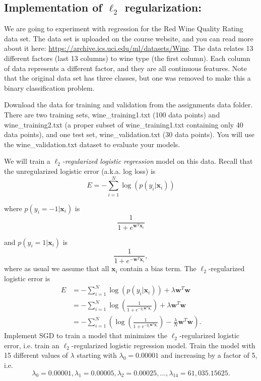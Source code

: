 \documentclass{article}
\begin{document}
\begin{solution}

\end{solution}

\subsection{Implementation of \texorpdfstring{$\ell_2$}{L2} regularization:}

We are going to experiment with regression for the Red Wine Quality Rating data set. The data set is uploaded on the course website, and you can read more about it here: \url{https://archive.ics.uci.edu/ml/datasets/Wine}. The data relates 13 different factors (last 13 columns) to wine type (the first column). Each column of data represents a different factor, and they are all continuous features. Note that the original data set has three classes, but one was removed to make this a binary classification problem.

Download the data for training and validation from the assignments data folder.
There are two training sets, wine\_training1.txt (100 data points) and wine\_training2.txt (a proper subset of wine\_training1.txt containing only 40 data points), and one test set, wine\_validation.txt (30 data points). You will use the wine\_validation.txt dataset to evaluate your models.

We will train a \emph{$\ell_2$-regularized logistic regression} model on this data. Recall that the unregularized logistic error (a.k.a. log loss) is
\[E = -\sum_{i=1}^{N}\log(p(y_i | \mathbf{x}_i))\]

where $p(y_i = -1 | \mathbf{x}_i)$ is
\[\frac{1}{1 + e^{\mathbf{w}^T\mathbf{x}_i}}\]

and $p(y_i = 1 | \mathbf{x}_i)$ is
\[\frac{1}{1 + e^{-\mathbf{w}^T\mathbf{x}_i}},\]
where as usual we assume that all $\mathbf{x}_i$ contain a bias term.
The $\ell_2$-regularized logistic error is 
\begin{align*}
  E &= -\sum_{i=1}^{N}\log(p(y_i | \mathbf{x}_i)) + \lambda\mathbf{w}^T\mathbf{w} \\
    &= -\sum_{i=1}^{N} \log \left( \frac{1}{1 + e^{-y_i\mathbf{w}^T\mathbf{x}_i}} \right) + \lambda\mathbf{w}^T\mathbf{w} \\
    &= -\sum_{i=1}^{N} \left(\log \left( \frac{1}{1 + e^{-y_i\mathbf{w}^T\mathbf{x}_i}} \right) - \frac{\lambda}{N}\mathbf{w}^T\mathbf{w}\right).
\end{align*}
Implement SGD to train a model that minimizes the $\ell_2$-regularized logistic error, i.e. train an $\ell_2$-regularized logistic regression model.  Train the model with 15 different values of $\lambda$ starting with $\lambda_0 = 0.00001$ and increasing by a factor of 5, i.e. $$\lambda_0 = 0.00001, \lambda_1 = 0.00005, \lambda_2 = 0.00025, ..., \lambda_{14} = 61,035.15625.$$
\par
\end{document}
